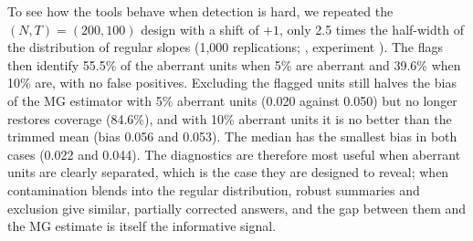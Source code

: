 To see how the tools behave when detection is hard, we repeated the
$(N,T)=(200,100)$ design with a shift of $+1$, only 2.5 times the
half-width of the distribution of regular slopes (1{,}000 replications;
, experiment ). The flags then identify
55.5\% of the aberrant units when 5\% are aberrant and 39.6\% when 10\% are,
with no false positives. Excluding the flagged units still halves the bias
of the MG estimator with 5\% aberrant units (0.020 against 0.050) but no
longer restores coverage (84.6\%), and with 10\% aberrant units it is no
better than the trimmed mean (bias 0.056 and 0.053). The median has the
smallest bias in both cases (0.022 and 0.044). The diagnostics are
therefore most useful when aberrant units are clearly separated, which is
the case they are designed to reveal; when contamination blends into the
regular distribution, robust summaries and exclusion give similar,
partially corrected answers, and the gap between them and the MG estimate
is itself the informative signal.
